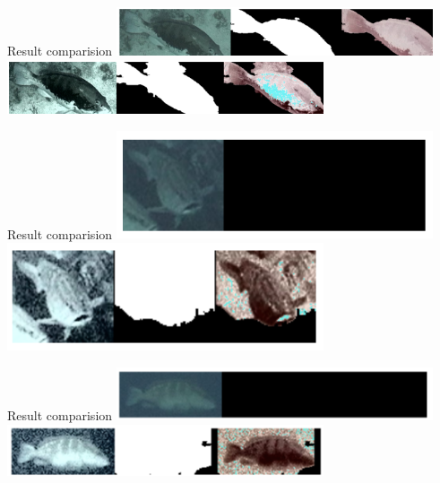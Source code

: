 \begin{frame}{Result comparision}
    \centering
      \includegraphics[height=0.7\textheight,width=0.7\textwidth,keepaspectratio]{images/gm4-7.png}
      \includegraphics[height=0.7\textheight,width=0.7\textwidth,keepaspectratio]{images/gm4-8.png}
   
\end{frame}

\begin{frame}{Result comparision}
    \centering
      \includegraphics[height=0.7\textheight,width=0.7\textwidth,keepaspectratio]{images/gm4-9.png}
      \includegraphics[height=0.7\textheight,width=0.7\textwidth,keepaspectratio]{images/gm4-10.png}
   
\end{frame}

\begin{frame}{Result comparision}
    \centering
      \includegraphics[height=0.7\textheight,width=0.7\textwidth,keepaspectratio]{images/gm4-11.png}
      \includegraphics[height=0.7\textheight,width=0.7\textwidth,keepaspectratio]{images/gm4-12.png}
   
\end{frame}

